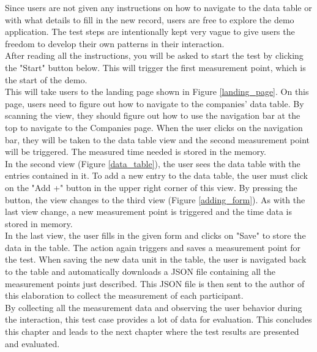 Since users are not given any instructions on how to navigate to the data table or with what details to fill in the new record, users are free to explore the demo application. The test steps are intentionally kept very vague to give users the freedom to develop their own patterns in their interaction. \\
After reading all the instructions, you will be asked to start the test by clicking the "Start" button below. This will trigger the first measurement point, which is the start of the demo. \\
This will take users to the landing page shown in Figure \ref{landing_page}. On this page, users need to figure out how to navigate to the companies' data table. By scanning the view, they should figure out how to use the navigation bar at the top to navigate to the Companies page. When the user clicks on the navigation bar, they will be taken to the data table view and the second measurement point will be triggered. The measured time needed is stored in the memory. \\
In the second view (Figure \ref{data_table}), the user sees the data table with the entries contained in it. To add a new entry to the data table, the user must click on the "Add +" button in the upper right corner of this view. By pressing the button, the view changes to the third view (Figure \ref{adding_form}). As with the last view change, a new measurement point is triggered and the time data is stored in memory. \\ 
In the last view, the user fills in the given form and clicks on "Save" to store the data in the table. The action again triggers and saves a measurement point for the test. When saving the new data unit in the table, the user is navigated back to the table and automatically downloads a JSON file containing all the measurement points just described. This JSON file is then sent to the author of this elaboration to collect the measurement of each participant. \\

By collecting all the measurement data and observing the user behavior during the interaction, this test case provides a lot of data for evaluation. This concludes this chapter and leads to the next chapter where the test results are presented and evaluated.